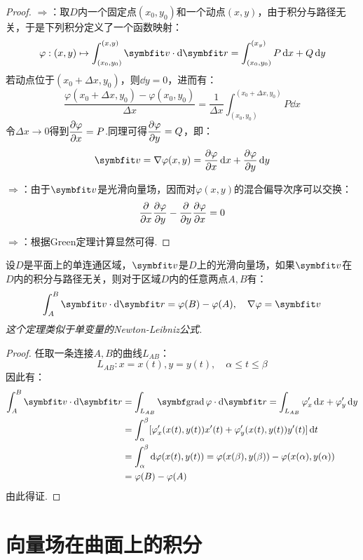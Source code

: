 \begin{proof}
    $\Rightarrow$：取$D$内一个固定点$(x_0,y_0)$和一个动点$(x,y)$，由于积分与路径无关，于是下列积分定义了一个函数映射：
    \[\varphi:(x,y)\mapsto\int_{(x_0,y_0)}^{(x,y)}\vb{v}\cdot\dd{\vb{r}} = \int_{(x_0,y_0)}^{(x_y)}P\dd{x}+Q\dd{y}\]
    若动点位于$(x_0+\Delta x,y_0)$，则$\dd{y}=0$，进而有：
    \[\frac{\varphi(x_0+\Delta x,y_0) - \varphi(x_0,y_0)}{\Delta x} = \frac{1}{\Delta x}\int_{(x_0,y_0)}^{(x_0+\Delta x,y_0)}P\dd{x}\]
    令$\Delta x \to 0$得到$\displaystyle\pdv{\varphi}{x} = P$.同理可得$\displaystyle\pdv{\varphi}{y} = Q$，即：
    \[\vb{v} = \nabla\varphi(x,y) = \pdv{\varphi}{x}\dd{x}+\pdv{\varphi}{y}\dd{y}\]

    $\Rightarrow$：由于$\vb{v}$是光滑向量场，因而对$\varphi(x,y)$的混合偏导次序可以交换：
    \[\pdv{x}\pdv{\varphi}{y} - \pdv{y}\pdv{\varphi}{x} = 0\]

    $\Rightarrow$：根据Green定理计算显然可得.
\end{proof}

\begin{theorem}
    设$D$是平面上的单连通区域，$\vb{v}$是$D$上的光滑向量场，如果$\vb{v}$在$D$内的积分与路径无关，则对于区域$D$内的任意两点$A,B$有：
    \[\int_{A}^{B}\vb{v}\cdot\dd{\vb{r}} = \varphi(B) - \varphi(A),\quad \nabla\varphi = \vb{v}\]
    \textit{这个定理类似于单变量的Newton-Leibniz公式.}
\end{theorem}

\begin{proof}
    任取一条连接$A,B$的曲线$L_{AB}$：
    \[L_{AB}:x = x(t), y = y(t),\quad \alpha\leqslant t \leqslant \beta\]
    因此有：
    \begin{align*}
        \int_{A}^{B}\vb{v}\cdot\dd{\vb{r}} &= \int_{L_{AB}}\grad\varphi\cdot\dd{\vb{r}} = \int_{L_{AB}}\varphi'_x\dd{x} + \varphi'_y\dd{y} \\
        &= \int_{\alpha}^{\beta}[\varphi'_x(x(t),y(t))x'(t) + \varphi'_y(x(t),y(t))y'(t)]\dd{t} \\
        &= \int_{\alpha}^{\beta}\dd{\varphi(x(t),y(t))} = \varphi(x(\beta),y(\beta)) - \varphi(x(\alpha),y(\alpha)) \\
        &= \varphi(B) - \varphi(A)
    \end{align*}
    由此得证.
\end{proof}


\section{向量场在曲面上的积分}
